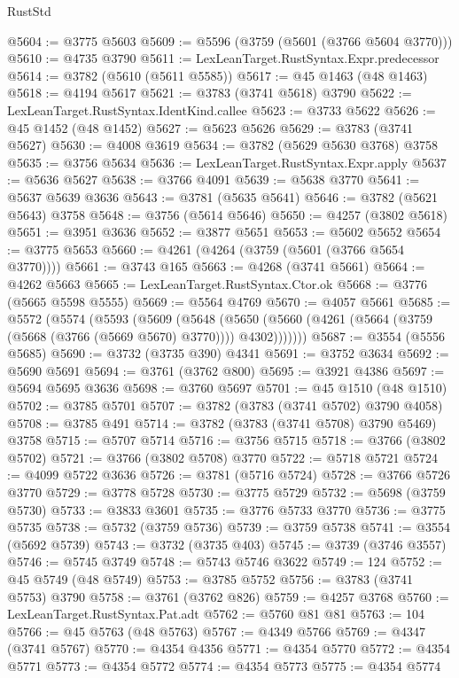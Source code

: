 \begin{lexlean}{RustStd}
\begin{coremodule}
@5604 := @3775 @5603
@5609 := @5596 (@3759 (@5601 (@3766 @5604 @3770)))
@5610 := @4735 @3790
@5611 := LexLeanTarget.RustSyntax.Expr.predecessor
@5614 := @3782 (@5610 (@5611 @5585))
@5617 := @45 @1463 (@48 @1463)
@5618 := @4194 @5617
@5621 := @3783 (@3741 @5618) @3790
@5622 := LexLeanTarget.RustSyntax.IdentKind.callee
@5623 := @3733 @5622
@5626 := @45 @1452 (@48 @1452)
@5627 := @5623 @5626
@5629 := @3783 (@3741 @5627)
@5630 := @4008 @3619
@5634 := @3782 (@5629 @5630 @3768) @3758
@5635 := @3756 @5634
@5636 := LexLeanTarget.RustSyntax.Expr.apply
@5637 := @5636 @5627
@5638 := @3766 @4091
@5639 := @5638 @3770
@5641 := @5637 @5639 @3636
@5643 := @3781 (@5635 @5641)
@5646 := @3782 (@5621 @5643) @3758
@5648 := @3756 (@5614 @5646)
@5650 := @4257 (@3802 @5618)
@5651 := @3951 @3636
@5652 := @3877 @5651
@5653 := @5602 @5652
@5654 := @3775 @5653
@5660 := @4261 (@4264 (@3759 (@5601 (@3766 @5654 @3770))))
@5661 := @3743 @165
@5663 := @4268 (@3741 @5661)
@5664 := @4262 @5663
@5665 := LexLeanTarget.RustSyntax.Ctor.ok
@5668 := @3776 (@5665 @5598 @5555)
@5669 := @5564 @4769
@5670 := @4057 @5661
@5685 := @5572
    (@5574
      (@5593
        (@5609
          (@5648
            (@5650 (@5660 (@4261 (@5664 (@3759 (@5668 (@3766 (@5669 @5670) @3770)))) @4302)))))))
@5687 := @3554 (@5556 @5685)
@5690 := @3732 (@3735 @390) @4341
@5691 := @3752 @3634
@5692 := @5690 @5691
@5694 := @3761 (@3762 @800)
@5695 := @3921 @4386
@5697 := @5694 @5695 @3636
@5698 := @3760 @5697
@5701 := @45 @1510 (@48 @1510)
@5702 := @3785 @5701
@5707 := @3782 (@3783 (@3741 @5702) @3790 @4058)
@5708 := @3785 @491
@5714 := @3782 (@3783 (@3741 @5708) @3790 @5469) @3758
@5715 := @5707 @5714
@5716 := @3756 @5715
@5718 := @3766 (@3802 @5702)
@5721 := @3766 (@3802 @5708) @3770
@5722 := @5718 @5721
@5724 := @4099 @5722 @3636
@5726 := @3781 (@5716 @5724)
@5728 := @3766 @5726 @3770
@5729 := @3778 @5728
@5730 := @3775 @5729
@5732 := @5698 (@3759 @5730)
@5733 := @3833 @3601
@5735 := @3776 @5733 @3770
@5736 := @3775 @5735
@5738 := @5732 (@3759 @5736)
@5739 := @3759 @5738
@5741 := @3554 (@5692 @5739)
@5743 := @3732 (@3735 @403)
@5745 := @3739 (@3746 @3557)
@5746 := @5745 @3749
@5748 := @5743 @5746 @3622
@5749 := 124
@5752 := @45 @5749 (@48 @5749)
@5753 := @3785 @5752
@5756 := @3783 (@3741 @5753) @3790
@5758 := @3761 (@3762 @826)
@5759 := @4257 @3768
@5760 := LexLeanTarget.RustSyntax.Pat.adt
@5762 := @5760 @81 @81
@5763 := 104
@5766 := @45 @5763 (@48 @5763)
@5767 := @4349 @5766
@5769 := @4347 (@3741 @5767)
@5770 := @4354 @4356
@5771 := @4354 @5770
@5772 := @4354 @5771
@5773 := @4354 @5772
@5774 := @4354 @5773
@5775 := @4354 @5774

\end{coremodule}
\end{lexlean}

